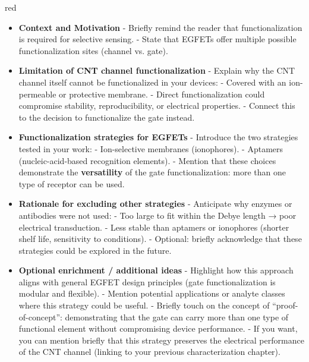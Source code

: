 \begin{color}{red}
    \begin{itemize}
    \item \textbf{Context and Motivation}  
    - Briefly remind the reader that functionalization is required for selective sensing.  
    - State that EGFETs offer multiple possible functionalization sites (channel vs. gate).  

    \item \textbf{Limitation of CNT channel functionalization}  
    - Explain why the CNT channel itself cannot be functionalized in your devices:  
      - Covered with an ion-permeable or protective membrane.  
      - Direct functionalization could compromise stability, reproducibility, or electrical properties.  
    - Connect this to the decision to functionalize the gate instead.  

    \item \textbf{Functionalization strategies for EGFETs}  
    - Introduce the two strategies tested in your work:  
      - Ion-selective membranes (ionophores).  
      - Aptamers (nucleic-acid-based recognition elements).  
    - Mention that these choices demonstrate the \textbf{versatility} of the gate functionalization: more than one type of receptor can be used.  

    \item \textbf{Rationale for excluding other strategies}  
    - Anticipate why enzymes or antibodies were not used:  
      - Too large to fit within the Debye length → poor electrical transduction.  
      - Less stable than aptamers or ionophores (shorter shelf life, sensitivity to conditions).  
    - Optional: briefly acknowledge that these strategies could be explored in the future.  

    \item \textbf{Optional enrichment / additional ideas}  
    - Highlight how this approach aligns with general EGFET design principles (gate functionalization is modular and flexible).  
    - Mention potential applications or analyte classes where this strategy could be useful.  
    - Briefly touch on the concept of “proof-of-concept”: demonstrating that the gate can carry more than one type of functional element without compromising device performance.  
    - If you want, you can mention briefly that this strategy preserves the electrical performance of the CNT channel (linking to your previous characterization chapter).  
\end{itemize}

\end{color}
